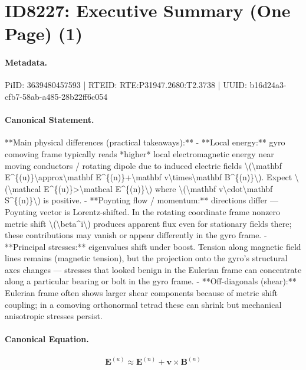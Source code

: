 \section*{ID8227: Executive Summary (One Page) (1)}
\paragraph{Metadata.}
PiID: 3639480457593 | RTEID: RTE:P31947.2680:T2.3738 | UUID: b16d24a3-cfb7-58ab-a485-28b22ff6c054

\paragraph{Canonical Statement.}
**Main physical differences (practical takeaways):** - **Local energy:** gyro comoving frame typically reads *higher* local electromagnetic energy near moving conductors / rotating dipole due to induced electric fields \textbackslash{}(\textbackslash{}mathbf E\textasciicircum{}\{(u)\}\textbackslash{}approx\textbackslash{}mathbf E\textasciicircum{}\{(n)\}+\textbackslash{}mathbf v\textbackslash{}times\textbackslash{}mathbf B\textasciicircum{}\{(n)\}\textbackslash{}). Expect \textbackslash{}(\textbackslash{}mathcal E\textasciicircum{}\{(u)\}>\textbackslash{}mathcal E\textasciicircum{}\{(n)\}\textbackslash{}) where \textbackslash{}(\textbackslash{}mathbf v\textbackslash{}cdot\textbackslash{}mathbf S\textasciicircum{}\{(n)\}\textbackslash{}) is positive. - **Poynting flow / momentum:** directions differ — Poynting vector is Lorentz-shifted. In the rotating coordinate frame nonzero metric shift \textbackslash{}(\textbackslash{}beta\textasciicircum{}i\textbackslash{}) produces apparent flux even for stationary fields there; these contributions may vanish or appear differently in the gyro frame. - **Principal stresses:** eigenvalues shift under boost. Tension along magnetic field lines remains (magnetic tension), but the projection onto the gyro’s structural axes changes — stresses that looked benign in the Eulerian frame can concentrate along a particular bearing or bolt in the gyro frame. - **Off-diagonals (shear):** Eulerian frame often shows larger shear components because of metric shift coupling; in a comoving orthonormal tetrad these can shrink but mechanical anisotropic stresses persist.

\paragraph{Canonical Equation.}
\[
\mathbf E^{(u)}\approx\mathbf E^{(n)}+\mathbf v\times\mathbf B^{(n)}
\]

